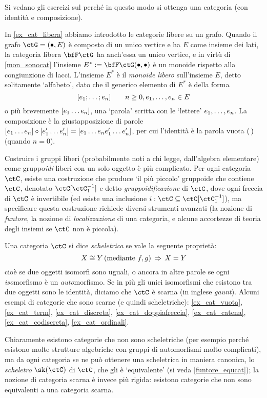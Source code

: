 Si vedano gli esercizi sul perché in questo modo si ottenga una categoria (con identità e composizione).
\begin{example}\label{mongruppi_liberi}
	In \ref{ex_cat_libera} abbiamo introdotto le categorie libere su un grafo. Quando il grafo \(\ctG=(\bullet,E)\) è composto di un unico vertice e ha \(E\) come insieme dei lati, la categoria libera \(\bfF\ctG\) ha anch'essa un unico vertice, e in virtù di \ref{mon_sonocat} l'insieme \(E^* := \bfF\ctG(\bullet,\bullet)\) è un monoide rispetto alla congiunzione di lacci. L'insieme \(E^*\) è il \emph{monoide libero} sull'insieme \(E\), detto solitamente `alfabeto', dato che il generico elemento di \(E^*\) è della forma
	\[[\tup en;]\qquad n\ge 0, \tup en,\in E\]
	o più brevemente \([\tup en{}]\), una `parola' scritta con le `lettere' \(\tup en,\). La composizione è la giustapposizione di parole \([\tup en{}]\cmp[\tup {e'}n{}] = [\tup en{}\tup{e'}n{}]\), per cui l'identità è la parola vuota \((\,)\) (quando \(n=0\)).

	Costruire i gruppi liberi (probabilmente noti a chi legge, dall'algebra elementare) come gruppo\emph{idi} liberi con un solo oggetto è più complicato. Per ogni categoria \(\ctC\), esiste una costruzione che produce `il più piccolo' gruppoide che contiene $\ctC$, denotato \(\ctC[\ctC_1^{-1}]\) e detto \emph{gruppoidificazione} di \(\ctC\), dove ogni freccia di \(\ctC\) è invertibile (ed esiste una inclusione \(i : \ctC\subseteq \ctC[\ctC_1^{-1}]\)), ma specificare questa costruzione richiede diversi strumenti avanzati (la nozione di \emph{funtore}, la nozione di \emph{localizzazione} di una categoria, e alcune accortezze di teoria degli insiemi se $\ctC$ non è piccola).
\end{example}
\begin{definition}\label{def_cat_scheletrica}
	Una categoria \(\ctC\) si dice \emph{scheletrica} se vale la seguente proprietà:
	\[X\cong Y \, (\text{mediante } f,g) \,\Rightarrow\, X=Y\]
	cioè se due oggetti isomorfi sono uguali, o ancora in altre parole se ogni \emph{iso}morfismo è un \emph{auto}morfismo. Se in più gli unici isomorfismi che esistono tra due oggetti sono le identità, diciamo che \(\ctC\) è scarna (in inglese \emph{gaunt}). Alcuni esempi di categorie che sono scarne (e quindi scheletriche): \ref{ex_cat_vuota}, \ref{ex_cat_term}, \ref{ex_cat_discreta}, \ref{ex_cat_doppiafreccia}, \ref{ex_cat_catena}, \ref{ex_cat_codiscreta}, \ref{ex_cat_ordinali}.
\end{definition}
Chiaramente esistono categorie che non sono scheletriche (per esempio perché esistono molte strutture algebriche con gruppi di automorfismi molto complicati), ma da ogni categoria se ne può ottenere una scheletrica in maniera canonica, lo \emph{scheletro} \(\sk(\ctC)\) di \(\ctC\), che gli è `equivalente' (si veda \ref{funtore_equcat}); la nozione di categoria scarna è invece più rigida: esistono categorie che non sono equivalenti a una categoria scarna.


